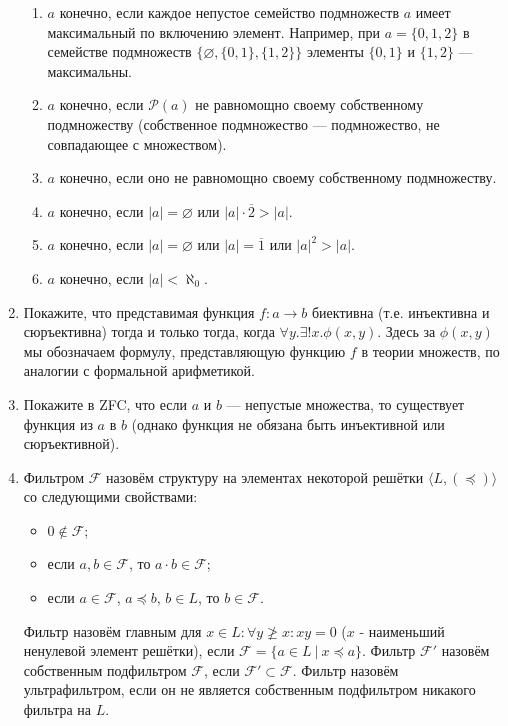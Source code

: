 \documentclass[10pt,a4paper,oneside]{article}
\begin{document}
\begin{enumerate}
\begin{enumerate}
\item $a$ конечно, если каждое непустое семейство подмножеств $a$ имеет максимальный по включению элемент.
Например, при $a = \{0,1,2\}$ в семействе подмножеств $\{\varnothing,\{0,1\},\{1,2\}\}$ элементы $\{0,1\}$ и $\{1,2\}$ --- максимальны.
\item $a$ конечно, если $\mathcal{P}(a)$ не равномощно своему собственному подмножеству (собственное подмножество --- подмножество, не совпадающее с множеством).
\item $a$ конечно, если оно не равномощно своему собственному подмножеству.
\item $a$ конечно, если $|a|=\varnothing$ или $|a|\cdot\overline{2} > |a|$.
\item $a$ конечно, если $|a|=\varnothing$ или $|a|=\overline{1}$ или $|a|^2 > |a|$.
\item $a$ конечно, если $|a|<\aleph_0$.
\end{enumerate}
\item Покажите, что представимая функция $f: a \rightarrow b$ биективна (т.е. инъективна и сюръективна) тогда и только тогда,
когда $\forall y.\exists!x.\phi(x,y)$. Здесь за $\phi(x,y)$ мы обозначаем формулу, представляющую функцию $f$
в теории множеств, по аналогии с формальной арифметикой.
\item Покажите в ZFC, что если $a$ и $b$ --- непустые множества, то существует функция из $a$ в $b$ 
(однако функция не обязана быть инъективной или сюръективной).

\item Фильтром $\mathcal{F}$ назовём структуру на элементах некоторой решётки $\langle L, (\preceq) \rangle$ со следующими свойствами:
\begin{itemize}
\item $0 \notin \mathcal{F}$;
\item если $a,b \in \mathcal{F}$, то $a \cdot b \in \mathcal{F}$;
\item если $a \in \mathcal{F}$, $a \preceq b$, $b \in L$, то $b \in \mathcal{F}$.
\end{itemize}

Фильтр назовём главным для $x \in L: \forall y \ngeq x: x y = 0$ ($x$ - наименьший ненулевой элемент решётки), если $\mathcal{F} = \{ a\in L\ |\ x \preceq a \}$.
Фильтр $\mathcal{F'}$ назовём собственным подфильтром $\mathcal{F}$, если $\mathcal{F'} \subset \mathcal{F}$.
Фильтр назовём ультрафильтром, если он не является собственным подфильтром никакого фильтра на $L$.


\end{enumerate}
\end{document}
